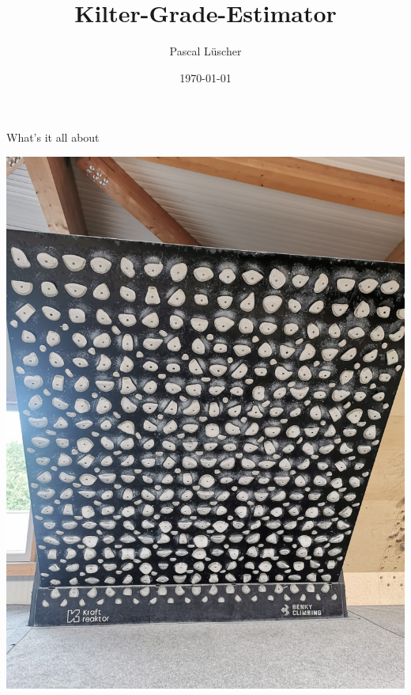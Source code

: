 \documentclass[aspectratio=169]{beamer}
\title{Kilter-Grade-Estimator}
\author{Pascal Lüscher}
\date{\today}
\begin{document}
\begin{frame}
  \titlepage
\end{frame}

\begin{frame}{What's it all about}
    \begin{center}
        \includegraphics[height=\textheight]{media/Kilter_Board.jpg}
      \end{center}
\end{frame}
\end{document}
